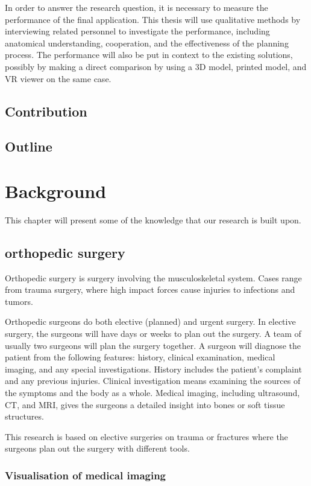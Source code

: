 \documentclass[a4paper]{report}
\begin{document}
In order to answer the research question, it is necessary to measure the
performance of the final application. This thesis will use qualitative methods
by interviewing related personnel to investigate the performance, including
anatomical understanding, cooperation, and the effectiveness of the planning
process.
The performance will also be put in context to the existing solutions, possibly
by making a direct comparison by using a 3D model, printed model, and VR viewer
on the same case.
\section{Contribution}
\section{Outline}

\chapter{Background}\label{Background}
This chapter will present some of the knowledge that our research is built upon. 

\section{orthopedic surgery}

Orthopedic surgery is surgery involving the musculoskeletal system. Cases range from trauma surgery, where high impact forces cause injuries to infections and tumors\cite{manual ortho}.

Orthopedic surgeons do both elective (planned) and urgent surgery. In elective surgery, the surgeons will have days or weeks to plan out the surgery. A team of usually two surgeons will plan the surgery together.
A surgeon will diagnose the patient from the following features: history, clinical examination, medical imaging, and any special investigations. History includes the patient's complaint and any previous injuries. Clinical investigation means examining the sources of the symptoms and the body as a whole. Medical imaging, including ultrasound, CT, and MRI, gives the surgeons a detailed insight into bones or soft tissue structures.

This research is based on elective surgeries on trauma or fractures where the surgeons plan out the surgery with different tools.

\subsection{Visualisation of medical imaging}
\end{document}
